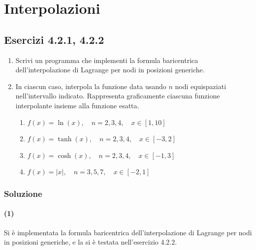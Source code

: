 \documentclass[letterpaper, 12pt]{article}
\numberwithin{equation}{section}    %
\begin{document}
\section{Interpolazioni}

\subsection{Esercizi 4.2.1, 4.2.2}
\begin{enumerate}
    \item Scrivi un programma che implementi la formula baricentrica dell'interpolazione di Lagrange per nodi in posizioni generiche.
    \item In ciascun caso, interpola la funzione data usando $n$ nodi equispaziati nell'intervallo indicato. Rappresenta graficamente ciascuna funzione interpolante insieme alla funzione esatta.
    \begin{enumerate}
        \item $f(x) = \ln (x), \quad n = 2,3,4, \quad x\in [1,10]$
        \item $f(x) = \tanh (x), \quad n = 2,3,4, \quad x \in [-3,2]$
        \item $f(x) = \cosh (x), \quad n = 2,3,4, \quad x \in [-1,3]$
        \item $f(x) = |x|, \quad n = 3,5,7, \quad x \in [-2,1]$
    \end{enumerate}
\end{enumerate}

\subsubsection{Soluzione}
\paragraph{(1) } Si è implementata la formula baricentrica dell'interpolazione di Lagrange 
per nodi in posizioni generiche, e la si è testata nell'esercizio 4.2.2.
\end{document}
